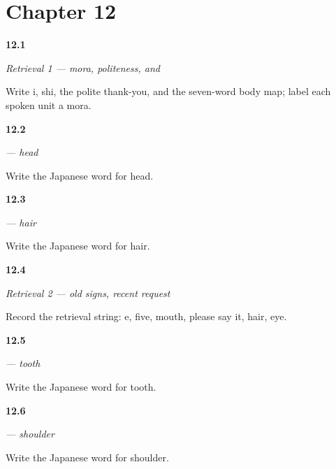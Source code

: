 \section*{Chapter 12}

\noindent\begin{minipage}[t]{\linewidth}
\raggedright
\hypertarget{review-JA-R12-foundation-01-card}{\textbf{12.1}} \emph{Retrieval 1 — mora, politeness, and }\par
\small Write i, shi, the polite thank-you, and the seven-word body map; label each spoken unit a mora.
\end{minipage}\par\medskip

\noindent\begin{minipage}[t]{\linewidth}
\raggedright
\hypertarget{review-JA-C12-atama-write}{\textbf{12.2}} \emph{ — head}\par
\small Write the Japanese word for head.
\end{minipage}\par\medskip

\noindent\begin{minipage}[t]{\linewidth}
\raggedright
\hypertarget{review-JA-C12-kami-write}{\textbf{12.3}} \emph{ — hair}\par
\small Write the Japanese word for hair.
\end{minipage}\par\medskip

\noindent\begin{minipage}[t]{\linewidth}
\raggedright
\hypertarget{review-JA-R12-foundation-02-card}{\textbf{12.4}} \emph{Retrieval 2 — old signs, recent request}\par
\small Record the retrieval string: e, five, mouth, please say it, hair, eye.
\end{minipage}\par\medskip

\noindent\begin{minipage}[t]{\linewidth}
\raggedright
\hypertarget{review-JA-C12-ha-tooth-write}{\textbf{12.5}} \emph{ — tooth}\par
\small Write the Japanese word for tooth.
\end{minipage}\par\medskip

\noindent\begin{minipage}[t]{\linewidth}
\raggedright
\hypertarget{review-JA-C12-kata-write}{\textbf{12.6}} \emph{ — shoulder}\par
\small Write the Japanese word for shoulder.
\end{minipage}\par\medskip

